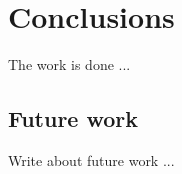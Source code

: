 \chapter{Conclusions}
\label{cha:conclusions}
\vspace{0.5 cm} 

The work is done ...

\vspace{0.5 cm} 
\section{Future work}
\label{sec:future}
\vspace{0.5 cm} 

Write about future work ...
